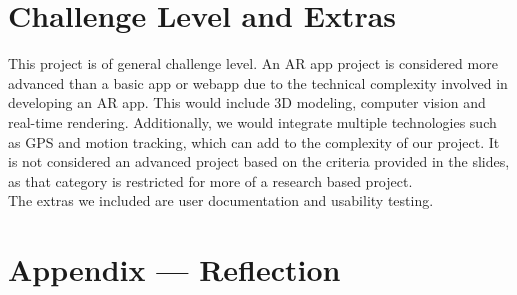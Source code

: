 \documentclass{article}
\begin{document}
\section{Challenge Level and Extras}

This project is of general challenge level. An AR app project is considered more advanced than a basic app or webapp due to the technical complexity involved in developing an AR app. This would include 3D modeling, computer vision and real-time rendering. Additionally, we would integrate multiple technologies such as GPS and motion tracking, which can add to the complexity of our project. It is not considered an advanced project based on the criteria provided in the slides, as that category is restricted for more of a research based project.\\

The extras we included are user documentation and usability testing.\\

\newpage{}

\section*{Appendix --- Reflection}



\end{document}
